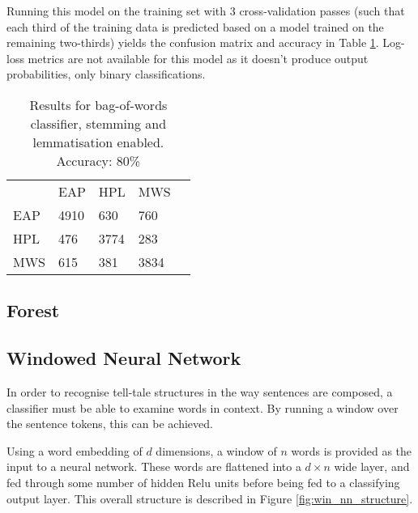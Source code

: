 Running this model on the training set with 3 cross-validation passes (such that each third of the training data is predicted based on a model trained on the remaining two-thirds) yields the confusion matrix and accuracy in Table \ref{tab:bow_cw}. Log-loss metrics are not available for this model as it doesn't produce output probabilities, only binary classifications.

\begin{table}[h]
\centering
\begin{tabular}{m{1cm}|m{1cm}|m{1cm}|m{1cm}|m{0cm}}
\multicolumn{1}{m{1cm}}{} & \multicolumn{1}{m{1cm}}{EAP} & \multicolumn{1}{m{1cm}}{HPL} & \multicolumn{1}{m{1cm}}{MWS} &\\[5pt]
\cline{2-4}
EAP & 4910 & 630 & 760 & \\[5pt]
\cline{2-4}
HPL & 476 & 3774 & 283 & \\[5pt]
\cline{2-4}
MWS & 615 & 381 & 3834 & \\[5pt]
\cline{2-4}
\end{tabular}
\caption{Results for bag-of-words classifier, stemming and lemmatisation enabled.\\Accuracy: 80\%}
\label{tab:bow_cw}
\end{table}

\subsection{Forest}
\label{sec:forest}

\subsection{Windowed Neural Network}
\label{sec:win_nn}
In order to recognise tell-tale structures in the way sentences are composed, a classifier must be able to examine words in context. By running a window over the sentence tokens, this can be achieved.

Using a word embedding of $d$ dimensions, a window of $n$ words is provided as the input to a neural network. These words are flattened into a $d \times n$ wide layer, and fed through some number of hidden Relu units before being fed to a classifying output layer. This overall structure is described in Figure \ref{fig:win_nn_structure}.

